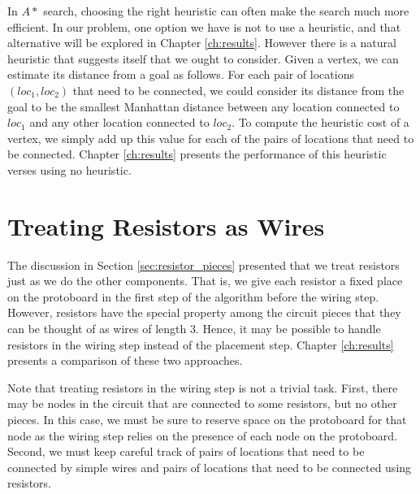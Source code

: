 In $A*$ search, choosing the right heuristic can often make the search much more
efficient. In our problem, one option we have is not to use a heuristic, and
that alternative will be explored in Chapter \ref{ch:results}. However there is
a natural heuristic that suggests itself that we ought to consider. Given a
vertex, we can estimate its distance from a goal as follows. For each pair of
locations $(loc_1, loc_2)$ that need to be connected, we could consider its
distance from the
goal to be the smallest Manhattan distance between any location connected to
$loc_1$ and any other location connected to $loc_2$. To compute the heuristic
cost of a vertex, we simply add up this value for each of the pairs of locations
that need to be connected. Chapter \ref{ch:results} presents the performance of
this heuristic verses using no heuristic.

\section{Treating Resistors as Wires}

The discussion in Section \ref{sec:resistor_pieces} presented that we treat
resistors just as we do the other components. That is, we give each resistor a
fixed place on the protoboard in the first step of the algorithm before the
wiring step. However, resistors have the special property among the circuit
pieces that they can be thought of as wires of length $3$.
Hence, it may be possible to handle resistors in the wiring step instead of the
placement step. Chapter \ref{ch:results} presents a comparison of these two
approaches.

Note that treating resistors in the wiring step is not a trivial task. First,
there may be nodes in the circuit that are connected to some resistors, but no
other pieces. In this case, we must be sure to reserve space on the protoboard
for that node as the wiring step relies on the presence of each node on the
protoboard. Second, we must keep careful track of pairs of locations that need
to be connected by simple wires and pairs of locations that need to be connected
using resistors.

\label{sec:resistors_as_wires}
